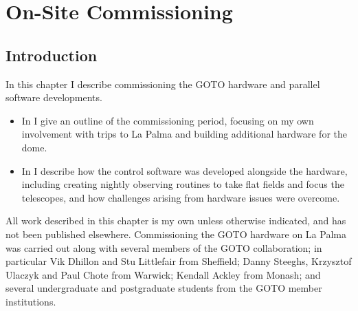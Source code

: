 \chapter{On-Site Commissioning}
\label{chap:commissioning}
\chaptoc{}


\newpage
\section{Introduction}
\label{sec:commissioning_intro}
\begin{colsection}

In this chapter I describe commissioning the GOTO hardware and parallel software developments.
%
\begin{itemize}
    \item In  I give an outline of the commissioning period, focusing on my own involvement with trips to La Palma and building additional hardware for the dome.
    \item In  I describe how the control software was developed alongside the hardware, including creating nightly observing routines to take flat fields and focus the telescopes, and how challenges arising from hardware issues were overcome.
\end{itemize}
%
All work described in this chapter is my own unless otherwise indicated, and has not been published elsewhere. Commissioning the GOTO hardware on La Palma was carried out along with several members of the GOTO collaboration; in particular Vik Dhillon and Stu Littlefair from Sheffield; Danny Steeghs, Krzysztof Ulaczyk and Paul Chote from Warwick; Kendall Ackley from Monash; and several undergraduate and postgraduate students from the GOTO member institutions.

\end{colsection}


\newpage
